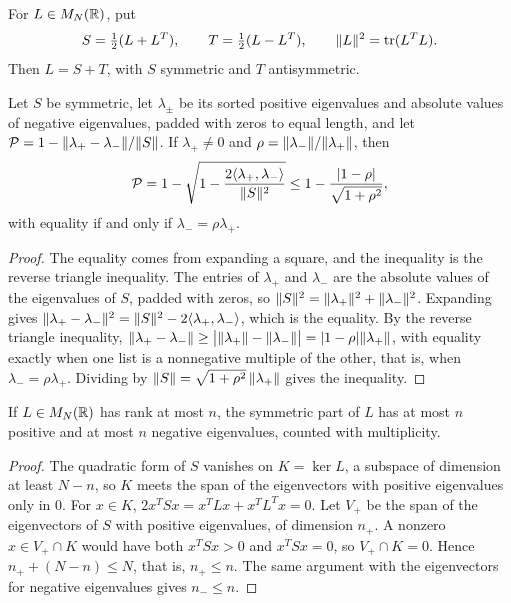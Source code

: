 \setcounter{definition}{0}
\renewcommand{\thedefinition}{A\arabic{definition}}
\begin{definition}
\label{def:parts}
\leanok
For $L\in M_N(\mathbb{R})$, put
\[
 S=\tfrac12(L+L^T),\qquad T=\tfrac12(L-L^T),\qquad
 \lVert L\rVert^2=\operatorname{tr}(L^TL).
\]
Then $L=S+T$, with $S$ symmetric and $T$ antisymmetric.
\end{definition}
\renewcommand{\thedefinition}{\arabic{definition}}

\begin{lemma}
\label{lem:pairing-bound}
\leanok
{}
Let $S$ be symmetric, let $\lambda_\pm$ be its sorted positive eigenvalues and
absolute values of negative eigenvalues, padded with zeros to equal length,
and let $\mathcal P=1-\lVert \lambda_+-\lambda_-\rVert/\lVert S\rVert$. If
$\lambda_+\ne0$ and $\rho=\lVert \lambda_-\rVert/\lVert \lambda_+\rVert$, then
\[
 \mathcal P=1-\sqrt{1-\frac{2\langle\lambda_+,\lambda_-\rangle}{\lVert S\rVert^2}}
 \le 1-\frac{|1-\rho|}{\sqrt{1+\rho^2}},
\]
with equality if and only if $\lambda_-=\rho\lambda_+$.
\end{lemma}
\begin{proof}
\leanok
{}
The equality comes from expanding a square, and the inequality is the
reverse triangle inequality. The entries of $\lambda_+$ and $\lambda_-$
are the absolute values of the eigenvalues of $S$, padded with zeros, so
$\lVert S\rVert^2=\lVert \lambda_+\rVert^2+\lVert \lambda_-\rVert^2$. Expanding gives
$\lVert \lambda_+-\lambda_-\rVert^2=\lVert S\rVert^2-2\langle\lambda_+,\lambda_-\rangle$,
which is the equality. By the reverse triangle inequality,
$\lVert \lambda_+-\lambda_-\rVert\ge\bigl|\lVert \lambda_+\rVert-\lVert \lambda_-\rVert\bigr|=|1-\rho|\lVert \lambda_+\rVert$,
with equality exactly when one list is a nonnegative multiple of the
other, that is, when $\lambda_-=\rho\lambda_+$. Dividing by
$\lVert S\rVert=\sqrt{1+\rho^2}\,\lVert \lambda_+\rVert$ gives the inequality.
\end{proof}

\begin{lemma}
\label{lem:rank-balance}
\leanok
{}
If $L\in M_N(\mathbb{R})$ has rank at most $n$, the symmetric part of $L$ has at
most $n$ positive and at most $n$ negative eigenvalues, counted with
multiplicity.
\end{lemma}
\begin{proof}
\leanok
{}
The quadratic form of $S$ vanishes on $K=\ker L$, a subspace of dimension
at least $N-n$, so $K$ meets the span of the eigenvectors with positive
eigenvalues only in $0$. For $x\in K$,
$2x^TSx=x^TLx+x^TL^Tx=0$. Let $V_+$ be the span of the eigenvectors of
$S$ with positive eigenvalues, of dimension $n_+$. A nonzero
$x\in V_+\cap K$ would have both $x^TSx>0$ and $x^TSx=0$, so
$V_+\cap K=0$. Hence $n_++(N-n)\le N$, that is, $n_+\le n$. The same
argument with the eigenvectors for negative eigenvalues gives $n_-\le n$.
\end{proof}

